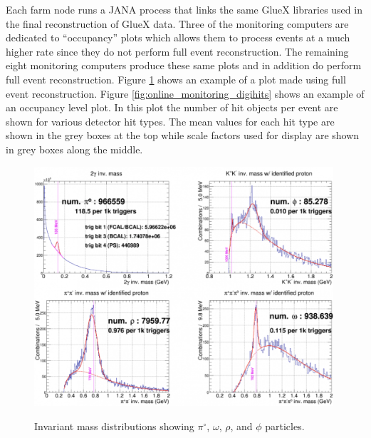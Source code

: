 Each farm node runs a JANA\cite{jana} process that links the same GlueX libraries used in the final reconstruction of GlueX data. Three of the monitoring computers are dedicated to ``occupancy'' plots which allows them to process events at a much higher rate since they do not perform full event reconstruction. The remaining eight monitoring computers produce these same plots and in addition do perform full event reconstruction. 
Figure \ref{fig:online_monitoring_PID} shows an example of a plot made using full event reconstruction. Figure \ref{fig:online_monitoring_digihits} shows an example of an occupancy level plot. In this plot the number of hit objects per event are shown for various detector hit types. The mean values for each hit type are shown in the grey boxes at the top while scale factors used for display are shown in grey boxes along the middle. 
\begin{figure}[tbp]
\begin{center}
\includegraphics[width=0.99\textwidth]{figures/online_monitoring_PID.png}
\label{fig:online_monitoring_PID}
\caption{Invariant mass distributions showing $\pi^\circ$, $\omega$, $\rho$, and $\phi$ particles.}   
\end{center}  
\end{figure}

